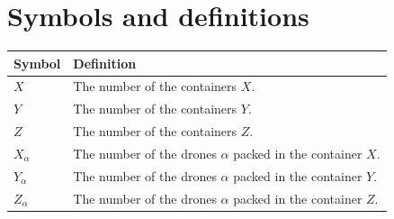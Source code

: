 \documentclass{mcmthesis}
\begin{document}
\section{Symbols and definitions}\label{section:Sym}
\renewcommand\arraystretch{1.5}
\begin{tabular}{ll}
	\hline
	Symbol&  Definition\\
	\hline
	$X$& The number of the containers $X$.\\
	
	$Y$& The number of the containers $Y$.\\
	
	$Z$& The number of the containers $Z$.\\
	
	$X_\alpha$& The number of the drones $\alpha$ packed in the container $X$.\\
	
	$Y_\alpha$& The number of the drones $\alpha$ packed in the container $Y$.\\
	
	$Z_\alpha$& The number of the drones $\alpha$ packed in the container $Z$.\\
	

	
	
 
	\hline
\end{tabular}
\end{document}
